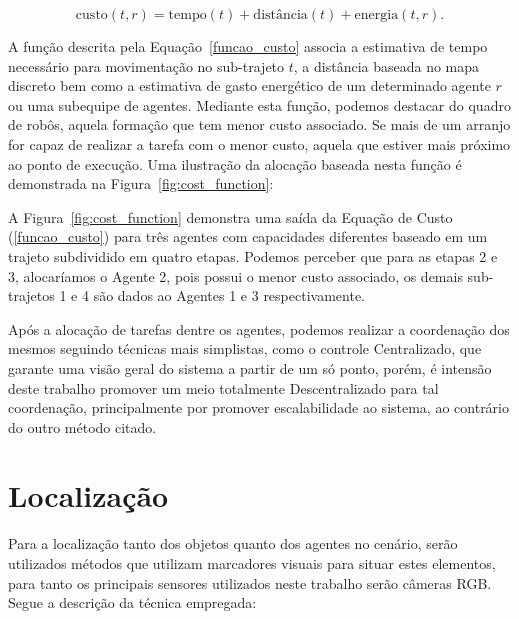 \begin{equation}
  \mbox{custo}(t, r) = \mbox{tempo}(t) + \mbox{distância}(t) + \mbox{energia}(t, r).
  \label{funcao_custo}
\end{equation}

A função descrita pela Equação~\ref{funcao_custo} associa a estimativa de tempo necessário para movimentação no sub-trajeto $t$, a distância baseada no mapa discreto bem como a estimativa de gasto energético de um determinado agente $r$ ou uma subequipe de agentes. Mediante esta função, podemos destacar do quadro de robôs, aquela formação que tem menor custo associado. Se mais de um arranjo for capaz de realizar a tarefa com o menor custo, aquela que estiver mais próximo ao ponto de execução. Uma ilustração da alocação baseada nesta função é demonstrada na Figura~\ref{fig:cost_function}:


A Figura~\ref{fig:cost_function} demonstra uma saída da Equação de Custo (\ref{funcao_custo}) para três agentes com capacidades diferentes baseado em um trajeto subdividido em quatro etapas. Podemos perceber que para as etapas 2 e 3, alocaríamos o Agente 2, pois possui o menor custo associado, os demais sub-trajetos 1 e 4 são dados ao Agentes 1 e 3 respectivamente.

Após a alocação de tarefas dentre os agentes, podemos realizar a coordenação dos mesmos seguindo técnicas mais simplistas, como o controle Centralizado, que garante uma visão geral do sistema a partir de um só ponto, porém, é intensão deste trabalho promover um meio totalmente Descentralizado para tal coordenação, principalmente por promover escalabilidade ao sistema, ao contrário do outro método citado.


\section{Localização} %
\label{sec:localiza_o}

Para a localização tanto dos objetos quanto dos agentes no cenário, serão utilizados métodos que utilizam marcadores visuais para situar estes elementos, para tanto os principais sensores utilizados neste trabalho serão câmeras RGB. Segue a descrição da técnica empregada:

